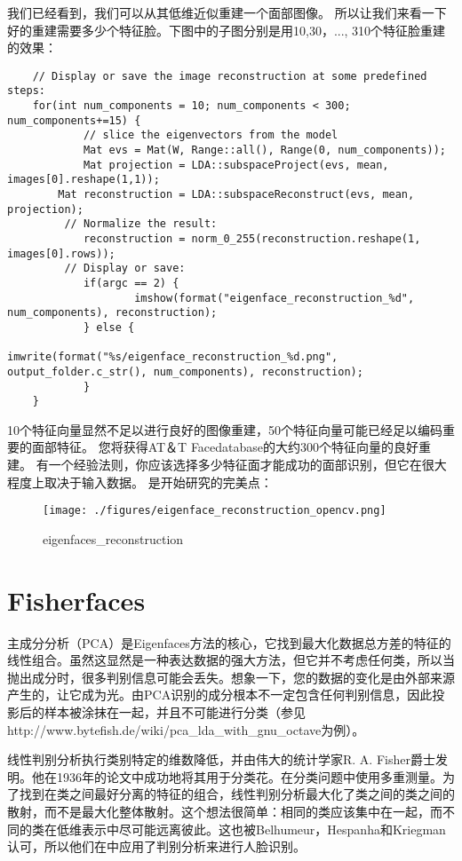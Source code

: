 \documentclass[UTF8]{ctexart}
\begin{document}
我们已经看到，我们可以从其低维近似重建一个面部图像。 所以让我们来看一下好的重建需要多少个特征脸。下图中的子图分别是用10,30，..., 310个特征脸重建的效果：
\begin{lstlisting}
	// Display or save the image reconstruction at some predefined steps:
	for(int num_components = 10; num_components < 300; num_components+=15) {
    		// slice the eigenvectors from the model
    		Mat evs = Mat(W, Range::all(), Range(0, num_components));
    		Mat projection = LDA::subspaceProject(evs, mean, images[0].reshape(1,1));
   		Mat reconstruction = LDA::subspaceReconstruct(evs, mean, projection);
   		 // Normalize the result:
    		reconstruction = norm_0_255(reconstruction.reshape(1, images[0].rows));
   		 // Display or save:
    		if(argc == 2) {
        			imshow(format("eigenface_reconstruction_%d", num_components), reconstruction);
    		} else {
        			imwrite(format("%s/eigenface_reconstruction_%d.png", output_folder.c_str(), num_components), reconstruction);
    		}
	}
\end{lstlisting}

10个特征向量显然不足以进行良好的图像重建，50个特征向量可能已经足以编码重要的面部特征。 您将获得AT＆T Facedatabase的大约300个特征向量的良好重建。 有一个经验法则，你应该选择多少特征面才能成功的面部识别，但它在很大程度上取决于输入数据。 \cite{Zhao2003}是开始研究的完美点：
\begin{figure}[htbp]
	\centerline{\texttt{[image: ./figures/eigenface\_reconstruction\_opencv.png]}}
	\caption{eigenfaces\_reconstruction}
\end{figure}

\section{Fisherfaces}
主成分分析（PCA）是Eigenfaces方法的核心，它找到最大化数据总方差的特征的线性组合。虽然这显然是一种表达数据的强大方法，但它并不考虑任何类，所以当抛出成分时，很多判别信息可能会丢失。想象一下，您的数据的变化是由外部来源产生的，让它成为光。由PCA识别的成分根本不一定包含任何判别信息，因此投影后的样本被涂抹在一起，并且不可能进行分类（参见http://www.bytefish.de/wiki/pca\_lda\_with\_gnu\_octave为例）。

线性判别分析执行类别特定的维数降低，并由伟大的统计学家R. A. Fisher爵士发明。他在1936年的论文中成功地将其用于分类花。在分类问题中使用多重测量\cite{Fisher1936}。为了找到在类之间最好分离的特征的组合，线性判别分析最大化了类之间的类之间的散射，而不是最大化整体散射。这个想法很简单：相同的类应该集中在一起，而不同的类在低维表示中尽可能远离彼此。这也被Belhumeur，Hespanha和Kriegman认可，所以他们在\cite{Belhumeur1997}中应用了判别分析来进行人脸识别。
\end{document}
